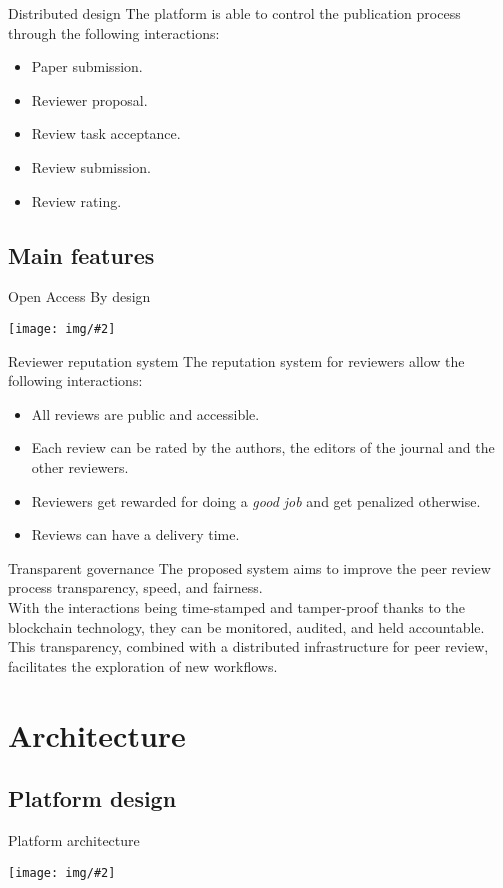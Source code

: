 \documentclass{beamer}
\newcommand{\framei}[2]{
  \begin{frame}{#1}
    \begin{center}
      \texttt{[image: img/\#2]}
    \end{center}
  \end{frame}
}
\newcommand{\framet}[2]{
  \begin{frame}{#1}
    #2
  \end{frame}
}
\begin{document}
\framet{Distributed design}{The platform is able to control the publication process through the following interactions:
\begin{itemize}
    \item Paper submission.
    \item Reviewer proposal.
    \item Review task acceptance.
    \item Review submission.
    \item Review rating.
\end{itemize}}

\subsection{Main features}
\framei{Open Access By design}{eipfs.png}

\framet{Reviewer reputation system}{The reputation system for reviewers allow the following interactions:
\begin{itemize}
    \item All reviews are public and accessible.
    \item Each review can be rated by the authors, the editors of the journal and the other reviewers.
    \item Reviewers get rewarded for doing a \emph{good job} and get penalized otherwise.
    \item Reviews can have a delivery time.
\end{itemize}
}

\framet{Transparent governance}{The proposed system aims to improve the peer review process transparency, speed,
and fairness.
\vspace{10mm} \\
With the interactions being time-stamped and
tamper-proof thanks to the blockchain technology, they can be monitored,
audited, and held accountable.
\vspace{10mm} \\
This transparency, combined with a distributed infrastructure for peer review,
facilitates the exploration of new workflows.
}

\section{Architecture}
\subsection{Platform design}
\framei{Platform architecture}{architecture.png}
\end{document}
